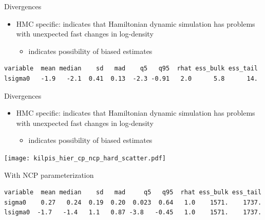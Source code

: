 \documentclass[finnish,english,t]{beamer}
\begin{document}
\begin{frame}[fragile]{Divergences}

  \begin{itemize}
  \item HMC specific: indicates that Hamiltonian dynamic simulation
    has problems with unexpected fast changes in log-density
    \begin{itemize}
    \item indicates possibility of biased estimates
    \end{itemize}
  \end{itemize}

     \vspace{-1\baselineskip}
     \footnotesize
\begin{verbatim}
variable  mean median    sd   mad    q5   q95  rhat ess_bulk ess_tail
lsigma0   -1.9   -2.1  0.41  0.13  -2.3 -0.91   2.0      5.8      14.
\end{verbatim}
     
\end{frame}

\begin{frame}[fragile]{Divergences}

  \begin{itemize}
  \item HMC specific: indicates that Hamiltonian dynamic simulation
    has problems with unexpected fast changes in log-density
    \begin{itemize}
    \item indicates possibility of biased estimates
    \end{itemize}
  \end{itemize}
  \begin{minipage}[t][5cm][t]{1.5\linewidth}
    \hspace{-0.9cm}\texttt{[image: kilpis\_hier\_cp\_ncp\_hard\_scatter.pdf]}
\end{minipage}

     \vspace{-\baselineskip}
     \footnotesize
     With NCP parameterization\\
     \vspace{-1.5\baselineskip}
\begin{verbatim}
variable  mean median    sd   mad     q5   q95  rhat ess_bulk ess_tail
sigma0    0.27   0.24  0.19  0.20  0.023  0.64   1.0    1571.    1737.
lsigma0  -1.7   -1.4   1.1   0.87 -3.8   -0.45   1.0    1571.    1737.
\end{verbatim}
     
\end{frame}
\end{document}
